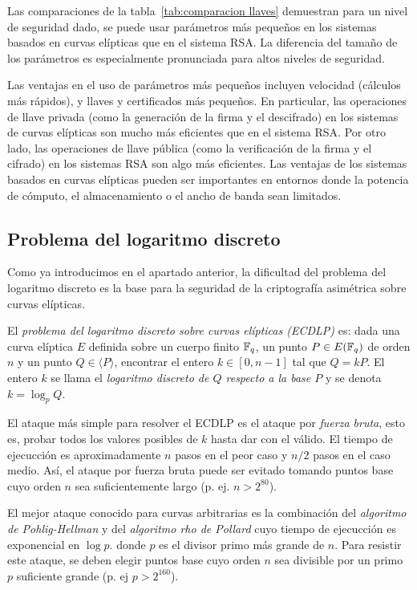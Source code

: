 Las comparaciones de la tabla~\ref{tab:comparacion llaves} demuestran para un nivel de seguridad dado, se puede usar parámetros más pequeños en los sistemas basados en curvas elípticas que en el sistema RSA. La diferencia del tamaño de los parámetros es especialmente pronunciada para altos niveles de seguridad.

Las ventajas en el uso de parámetros más pequeños incluyen velocidad (cálculos más rápidos),  y llaves y certificados más pequeños. En particular, las operaciones de llave privada (como la generación de la firma y el descifrado) en los sistemas de curvas elípticas son mucho más eficientes que en el sistema RSA. Por otro lado, las operaciones de llave pública (como la verificación de la firma y el cifrado) en los sistemas RSA son algo más eficientes. Las ventajas de los sistemas basados en curvas elípticas pueden ser importantes en entornos donde la potencia de cómputo, el almacenamiento o el ancho de banda sean limitados.

\subsection{Problema del logaritmo discreto}
\label{sub:Problema del logaritmo discreto}

Como ya introducimos en el apartado anterior, la dificultad del problema del logaritmo discreto es la base para la seguridad de la criptografía asimétrica sobre curvas elípticas.

\begin{definicion}
    El \emph{problema del logaritmo discreto sobre curvas elípticas (ECDLP)} es: dada una curva elíptica $E$ definida sobre un cuerpo finito $\mathbb{F}_q$, un punto $P \in E(\mathbb{F}_q)$ de orden $n$ y un punto $Q \in \langle P \rangle$, encontrar el entero $k \in [0, n - 1]$ tal que $Q = k P$. El entero $k$ se llama el \emph{logaritmo discreto de $Q$ respecto a la base $P$} y se denota $k = \log_p Q$.
\end{definicion}

El ataque más simple para resolver el ECDLP es el ataque por \emph{fuerza bruta}, esto es, probar todos los valores posibles de $k$ hasta dar con el válido. El tiempo de ejecucción es aproximadamente $n$ pasos en el peor caso y $n / 2$ pasos en el caso medio. Así, el ataque por fuerza bruta puede ser evitado tomando puntos base cuyo orden $n$ sea suficientemente largo (p. ej. $n > 2^{80}$).

El mejor ataque conocido para curvas arbitrarias es la combinación del \emph{algoritmo de Pohlig-Hellman} y del \emph{algoritmo rho de Pollard} cuyo tiempo de ejecucción es exponencial en $\log{p}$. donde $p$ es el divisor primo más grande de $n$. Para resistir este ataque, se deben elegir puntos base cuyo orden $n$ sea divisible por un primo $p$ suficiente grande (p. ej $p > 2^{160}$).

